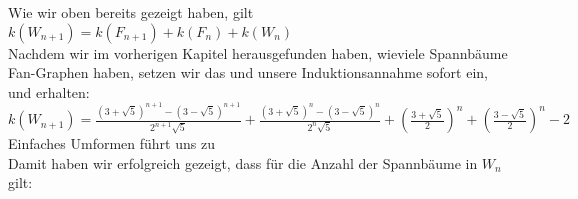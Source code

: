 Wie wir oben bereits gezeigt haben, gilt
$\mathit{k}(W_{n+1}) = \mathit{k}(F_{n+1}) + \mathit{k}(F_n) + \mathit{k}(W_n)$\\
Nachdem wir im vorherigen Kapitel herausgefunden haben, wieviele Spannbäume Fan-Graphen haben, setzen wir das und unsere Induktionsannahme sofort ein, und erhalten:\\
$\mathit{k}(W_{n+1}) = \frac{(3+\sqrt{5})^{n+1}-(3-\sqrt{5})^{n+1}}{2^{n+1}\sqrt{5}} + \frac{(3+\sqrt{5})^{n}-(3-\sqrt{5})^{n}}{2^{n}\sqrt{5}} + (\frac{3+\sqrt{5}}{2})^n+(\frac{3-\sqrt{5}}{2})^n-2$\\
Einfaches Umformen führt uns zu\\
Damit haben wir erfolgreich gezeigt, dass für die Anzahl der Spannbäume in $W_n$ gilt:\\


